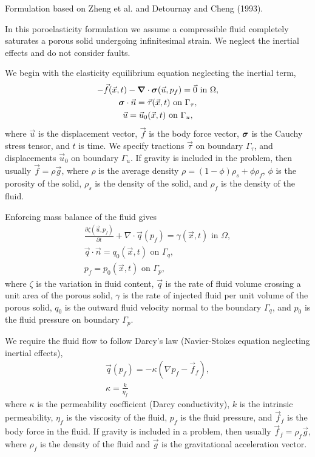 
Formulation based on Zheng et al. and Detournay and Cheng (1993).

In this poroelasticity formulation we assume a compressible fluid
completely saturates a porous solid undergoing infinitesimal
strain. We neglect the inertial effects and do not consider faults.

We begin with the elasticity equilibrium equation neglecting the inertial term,
\begin{gather}
  - \vec{f}(\vec{x},t) - \tensor{\nabla} \cdot \tensor{\sigma}(\vec{u},p_f) = \vec{0} 
\text{ in }\Omega, \\
%
  \tensor{\sigma} \cdot \vec{n} = \vec{\tau}(\vec{x},t) \text{ on }\Gamma_\tau, \\
%
  \vec{u} = \vec{u}_0(\vec{x},t) \text{ on }\Gamma_u,
\end{gather}
where $\vec{u}$ is the displacement vector, $\vec{f}$ is the body
force vector, $\bm{\sigma}$ is the Cauchy stress tensor, and $t$
is time. We specify tractions $\vec{\tau}$ on boundary $\Gamma_\tau$, and
displacements $\vec{u}_0$ on boundary $\Gamma_u$. If gravity is included in
the problem, then usually $\vec{f} = \rho \vec{g}$, where $\rho$ is
the average density $\rho = (1-\phi)\rho_s + \phi \rho_f$, $\phi$ is
the porosity of the solid, $\rho_s$ is the density of the solid, and
$\rho_f$ is the density of the fluid.

Enforcing mass balance of the fluid gives
\begin{gather}
  \frac{\partial \zeta(\vec{u},p_f)}{\partial t} + \nabla \cdot \vec{q}(p_f) = 
\gamma(\vec{x},t) \text{ in }
\Omega, \\
%
  \vec{q} \cdot \vec{n} = q_0(\vec{x},t) \text{ on }\Gamma_q, \\
%
  p_f = p_0(\vec{x},t) \text{ on }\Gamma_p,
\end{gather}
where $\zeta$ is the variation in fluid content, $\vec{q}$ is the rate
of fluid volume crossing a unit area of the porous solid, $\gamma$ is
the rate of injected fluid per unit volume of the porous solid, $q_0$
is the outward fluid velocity normal to the boundary $\Gamma_q$, and
$p_0$ is the fluid pressure on boundary $\Gamma_p$.

We require the fluid flow to follow Darcy's law (Navier-Stokes equation neglecting inertial 
effects),
\begin{gather}
  \vec{q}(p_f) = -\kappa (\nabla p_f - \vec{f}_f), \\
%
  \kappa = \frac{k}{\eta_f}
\end{gather}
where $\kappa$ is the permeability coefficient (Darcy conductivity),
$k$ is the intrinsic permeability, $\eta_f$ is the viscosity of the
fluid, $p_f$ is the fluid pressure, and $\vec{f}_f$ is the body force
in the fluid. If gravity is included in a problem, then usually
$\vec{f}_f = \rho_f \vec{g}$, where $\rho_f$ is the density of the
fluid and $\vec{g}$ is the gravitational acceleration vector.

